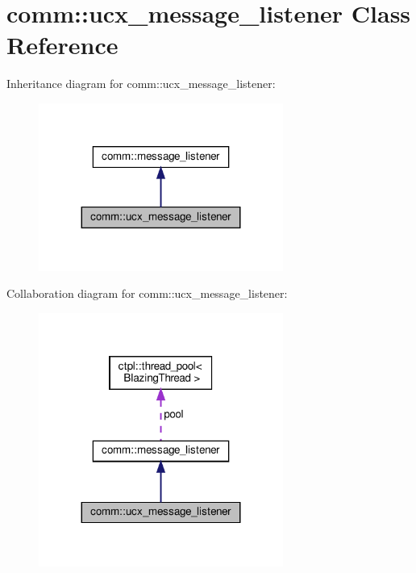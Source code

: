 \hypertarget{classcomm_1_1ucx__message__listener}{}\section{comm\+:\+:ucx\+\_\+message\+\_\+listener Class Reference}
\label{classcomm_1_1ucx__message__listener}


Inheritance diagram for comm\+:\+:ucx\+\_\+message\+\_\+listener\+:\nopagebreak
\begin{figure}[H]
\begin{center}
\leavevmode
\includegraphics[width=227pt]{classcomm_1_1ucx__message__listener__inherit__graph}
\end{center}
\end{figure}


Collaboration diagram for comm\+:\+:ucx\+\_\+message\+\_\+listener\+:\nopagebreak
\begin{figure}[H]
\begin{center}
\leavevmode
\includegraphics[width=227pt]{classcomm_1_1ucx__message__listener__coll__graph}
\end{center}
\end{figure}
